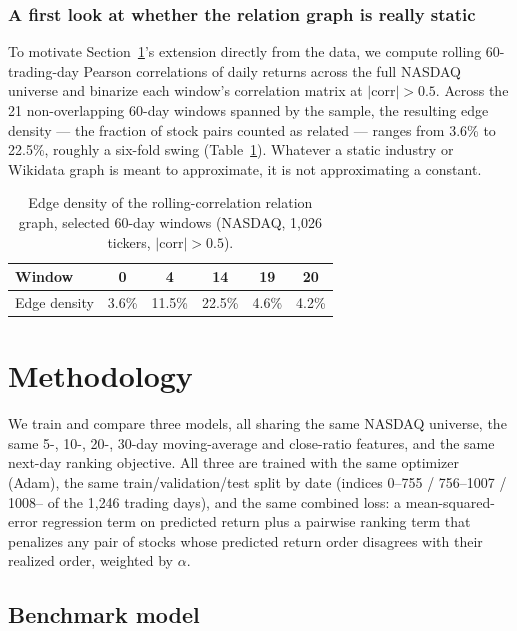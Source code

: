 \documentclass[12pt]{article}
\begin{document}
\subsubsection{A first look at whether the relation graph is really static}

To motivate Section~\ref{sec:methods}'s extension directly from the data, we compute rolling
60-trading-day Pearson correlations of daily returns across the full NASDAQ universe and binarize
each window's correlation matrix at $|\text{corr}| > 0.5$. Across the 21 non-overlapping 60-day
windows spanned by the sample, the resulting edge density --- the fraction of stock pairs counted
as related --- ranges from 3.6\% to 22.5\%, roughly a six-fold swing (Table~\ref{tab:density}).
Whatever a static industry or Wikidata graph is meant to approximate, it is not approximating a
constant.

\begin{table}[h]
\centering
\caption{Edge density of the rolling-correlation relation graph, selected 60-day windows
(NASDAQ, 1{,}026 tickers, $|\text{corr}|>0.5$).}
\label{tab:density}
\begin{tabular}{lccccc}
\toprule
Window & 0 & 4 & 14 & 19 & 20 \\
\midrule
Edge density & 3.6\% & 11.5\% & 22.5\% & 4.6\% & 4.2\% \\
\bottomrule
\end{tabular}
\end{table}


\section{Methodology}
\label{sec:methods}

We train and compare three models, all sharing the same NASDAQ universe, the same 5-, 10-, 20-,
30-day moving-average and close-ratio features, and the same next-day ranking objective. All
three are trained with the same optimizer (Adam), the same train/validation/test split by date
(indices 0--755 / 756--1007 / 1008-- of the 1{,}246 trading days), and the same combined loss:
a mean-squared-error regression term on predicted return plus a pairwise ranking term that
penalizes any pair of stocks whose predicted return order disagrees with their realized order,
weighted by $\alpha$.

\subsection{Benchmark model}
\end{document}
